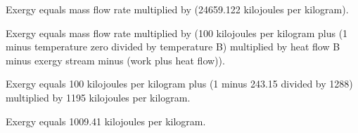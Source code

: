 Exergy equals mass flow rate multiplied by (24659.122 kilojoules per kilogram).  

Exergy equals mass flow rate multiplied by (100 kilojoules per kilogram plus (1 minus temperature zero divided by temperature B) multiplied by heat flow B minus exergy stream minus (work plus heat flow)).  

Exergy equals 100 kilojoules per kilogram plus (1 minus 243.15 divided by 1288) multiplied by 1195 kilojoules per kilogram.  

Exergy equals 1009.41 kilojoules per kilogram.